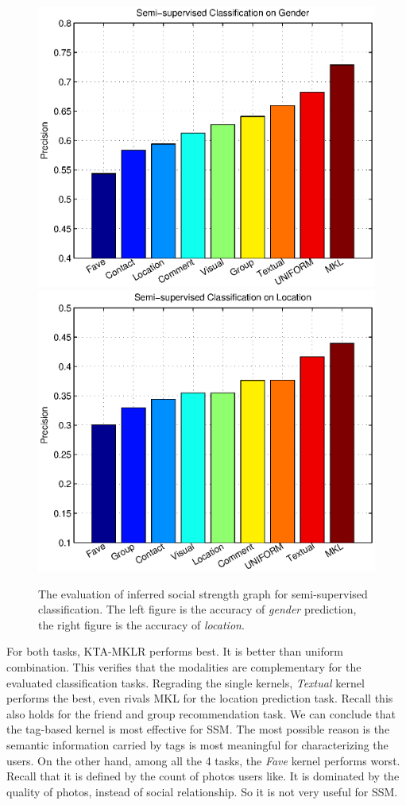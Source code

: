 \begin{figure}[!tb]
\begin{center}
\includegraphics[width=12cm]{figures/gender.eps}
\includegraphics[width=12cm]{figures/location.eps}
\hspace{-5mm}
\caption{The evaluation of inferred social strength graph for semi-supervised classification. The left figure is the accuracy of {\em gender} prediction, the
right figure is the accuracy of {\em location}.}
\end{center}
\vspace{-5mm}
\end{figure}

For both tasks, KTA-MKLR performs best. It is better than uniform combination. This verifies that the modalities are complementary for the evaluated
classification tasks. Regrading the single kernels, {\em Textual} kernel performs the best, even rivals MKL for the location prediction task. Recall this also
holds for the friend and group recommendation task. We can conclude that the tag-based kernel is most effective for SSM. The most possible reason is the
semantic information carried by tags is most meaningful for characterizing the users. On the other hand, among all the 4 tasks, the {\em Fave} kernel performs
worst. Recall that it is defined by the count of photos users like. It is dominated by the quality of photos, instead of social relationship. So it is not very
useful for SSM.

